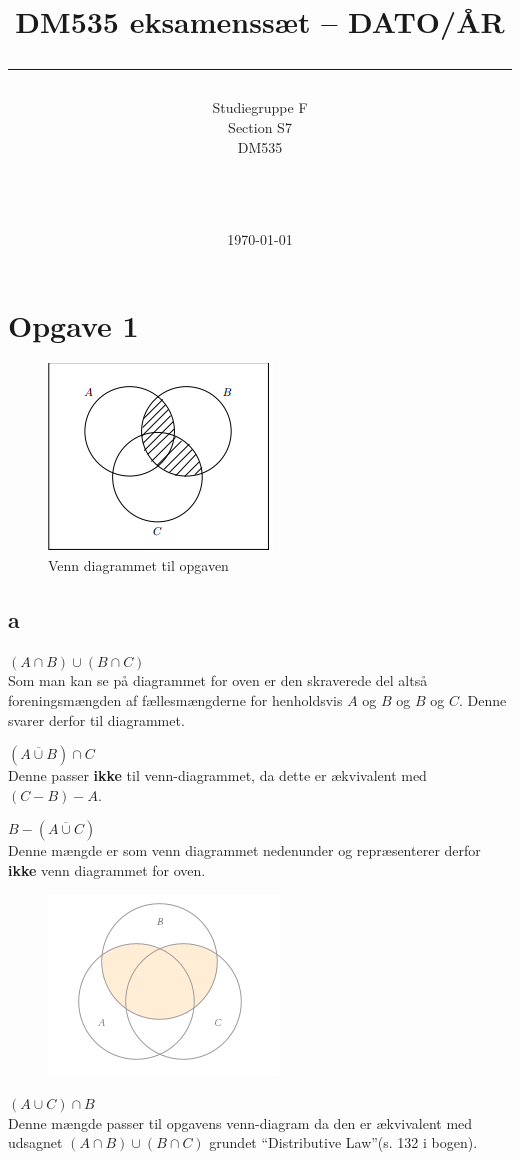 \documentclass[a4paper,10pt]{article}
\title{DM535 eksamenssæt -- DATO/ÅR \\ \rule{10cm}{0.5mm}}
\author{Studiegruppe F \\ Section S7 \\
DM535\\\rule{5.5cm}{0.5mm}\\}
\date{\today}
\begin{document}
\maketitle
\vfill
\tableofcontents
\newpage
\section{Opgave 1}
\begin{figure}[h]
\center
\caption{Venn diagrammet til opgaven}
\includegraphics[scale=0.5]{venn-jan13}
\end{figure}
\subsection{a}
\begin{description}
    \item $(A \cap B) \cup (B \cap C)$ \hfill \\
        Som man kan se på diagrammet for oven er den skraverede del altså
        foreningsmængden af fællesmængderne for henholdsvis $A$ og $B$ og $B$
        og $C$. Denne svarer derfor til diagrammet.
    \item $(\overline{A \cup B}) \cap C$ \hfill \\
        Denne passer \textbf{ikke} til venn-diagrammet, da dette er ækvivalent
        med $ (C - B) - A$.
    \item $B - (\overline{A \cup C})$ \hfill \\
        Denne mængde er som venn diagrammet nedenunder og repræsenterer derfor
        \textbf{ikke} venn diagrammet for oven.
        \begin{figure}[h]
        \center
        \includegraphics[scale=0.5]{venn2-jan13}
        \end{figure}
    \item $(A \cup C) \cap B$ \hfill \\
        Denne mængde passer til opgavens venn-diagram da den er ækvivalent med
        udsagnet $(A \cap B) \cup (B \cap C)$ grundet ``Distributive Law''(s.
        132 i bogen).
\end{description}
\end{document}
